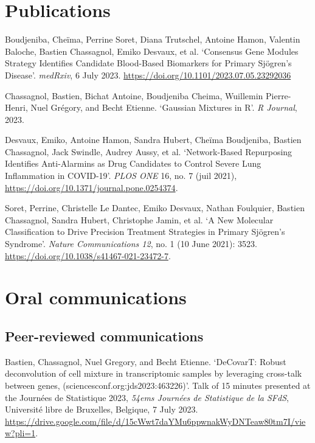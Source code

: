 \chapter{Publications}
Boudjeniba, Cheïma, Perrine Soret, Diana Trutschel, Antoine Hamon, Valentin Baloche, Bastien Chassagnol, Emiko Desvaux, et al. ‘Consensus Gene Modules Strategy Identifies Candidate Blood-Based Biomarkers for Primary Sjögren’s Disease’. \emph{medRxiv}, 6 July 2023. 
\url{https://doi.org/10.1101/2023.07.05.23292036} \newline

Chassagnol, Bastien, Bichat Antoine, Boudjeniba Cheima, Wuillemin Pierre-Henri, Nuel Grégory, and Becht Etienne. ‘Gaussian Mixtures in R’. \emph{R Journal}, 2023. \newline


Desvaux, Emiko, Antoine Hamon, Sandra Hubert, Cheïma Boudjeniba, Bastien Chassagnol, Jack Swindle, Audrey Aussy, et al. ‘Network-Based Repurposing Identifies Anti-Alarmins as Drug Candidates to Control Severe Lung Inflammation in COVID-19’. \emph{PLOS ONE} 16, no. 7 (juil 2021), 
\url{https://doi.org/10.1371/journal.pone.0254374}. \newline


Soret, Perrine, Christelle Le Dantec, Emiko Desvaux, Nathan Foulquier, Bastien Chassagnol, Sandra Hubert, Christophe Jamin, et al. ‘A New Molecular Classification to Drive Precision Treatment Strategies in Primary Sjögren’s Syndrome’. \emph{Nature Communications 12}, no. 1 (10 June 2021): 3523. 
\url{https://doi.org/10.1038/s41467-021-23472-7}. \newline



\newpage
\chapter{Oral communications}

\section{Peer-reviewed communications}
Bastien, Chassagnol, Nuel Gregory, and Becht Etienne. ‘DeCovarT: Robust deconvolution of cell mixture in transcriptomic samples by leveraging cross-talk between genes, (sciencesconf.org:jds2023:463226)’. Talk of 15 minutes presented at the Journées de Statistique 2023, \emph{54ems Journées de Statistique de la SFdS}, Université libre de Bruxelles, Belgique, 7 July 2023. 
\url{https://drive.google.com/file/d/15cWwt7daYMu6ppwnakWyDNTeaw80tm7I/view?pli=1}.\newline


